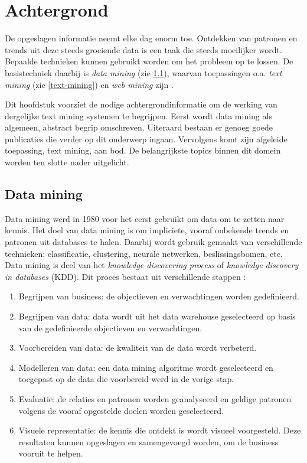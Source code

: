 \chapter{Achtergrond}

De opgeslagen informatie neemt elke dag enorm toe. Ontdekken van patronen en trends uit deze steeds groeiende data is een taak die steeds moeilijker wordt. Bepaalde technieken kunnen gebruikt worden om het probleem op te lossen. De basistechniek daarbij is \textit{data mining} (zie \ref{data-mining}), waarvan toepassingen o.a. \textit{text mining} (zie \ref{text-mining}) en \textit{web mining} zijn \cite{Nasa2012}. 

Dit hoofdstuk voorziet de nodige achtergrondinformatie om de werking van dergelijke text mining systemen te begrijpen. Eerst wordt data mining als algemeen, abstract begrip omschreven. Uiteraard bestaan er genoeg goede publicaties die verder op dit onderwerp ingaan. Vervolgens komt zijn afgeleide toepassing, text mining, aan bod. De belangrijkste topics binnen dit domein worden ten slotte nader uitgelicht. 

\section{Data mining}\label{data-mining}
Data mining werd in 1980 voor het eerst gebruikt om data om te zetten naar kennis. Het doel van data mining is om impliciete, vooraf onbekende trends en patronen uit databases te halen. Daarbij wordt gebruik gemaakt van verschillende technieken: classificatie, clustering, neurale netwerken, beslissingsbomen, etc. 
\\Data mining is deel van het \textit{knowledge discovering process} of \textit{knowledge discovery in databases} (KDD). Dit proces bestaat uit verschillende stappen \cite{Fayyad1996}:
\begin{enumerate}
	\item Begrijpen van business: de objectieven en verwachtingen worden gedefinieerd.
	\item Begrijpen van data: data wordt uit het data warehouse geselecteerd op basis van de gedefinieerde objectieven en verwachtingen.
	\item Voorbereiden van data: de kwaliteit van de data wordt verbeterd.
	\item Modelleren van data: een data mining algoritme wordt geselecteerd en toegepast op de data die voorbereid werd in de vorige stap.
	\item Evaluatie: de relaties en patronen worden geanalyseerd en geldige patronen volgens de vooraf opgestelde doelen worden geselecteerd.
	\item Visuele representatie: de kennis die ontdekt is wordt visueel voorgesteld. Deze resultaten kunnen opgeslagen en samengevoegd worden, om de business vooruit te helpen.
\end{enumerate}


